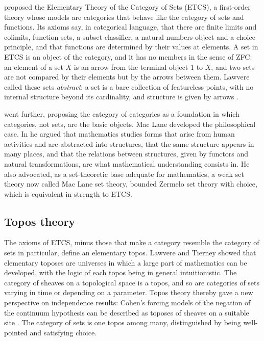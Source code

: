 \documentclass{situationist-preprint}
\begin{document}
\citet{Lawvere1964} proposed the Elementary Theory of the Category of Sets (ETCS), a first-order theory whose models are categories that behave like the category of sets and functions. Its axioms say, in categorical language, that there are finite limits and colimits, function sets, a subset classifier, a natural numbers object and a choice principle, and that functions are determined by their values at elements. A set in ETCS is an object of the category, and it has no members in the sense of ZFC: an element of a set $X$ is an arrow from the terminal object $1$ to $X$, and two sets are not compared by their elements but by the arrows between them. Lawvere called these sets \emph{abstract}: a set is a bare collection of featureless points, with no internal structure beyond its cardinality, and structure is given by arrows \citep{LawvereRosebrugh2003}.

\citet{Lawvere1966} went further, proposing the category of categories as a foundation in which categories, not sets, are the basic objects. Mac Lane developed the philosophical case. In \citet{MacLane1986} he argued that mathematics studies forms that arise from human activities and are abstracted into structures, that the same structure appears in many places, and that the relations between structures, given by functors and natural transformations, are what mathematical understanding consists in. He also advocated, as a set-theoretic base adequate for mathematics, a weak set theory now called Mac Lane set theory, bounded Zermelo set theory with choice, which is equivalent in strength to ETCS.

\subsection{Topos theory}

The axioms of ETCS, minus those that make a category resemble the category of sets in particular, define an elementary topos. Lawvere and Tierney showed that elementary toposes are universes in which a large part of mathematics can be developed, with the logic of each topos being in general intuitionistic. The category of sheaves on a topological space is a topos, and so are categories of sets varying in time or depending on a parameter. Topos theory thereby gave a new perspective on independence results: Cohen's forcing models of the negation of the continuum hypothesis can be described as toposes of sheaves on a suitable site \citep{MacLaneMoerdijk1992}. The category of sets is one topos among many, distinguished by being well-pointed and satisfying choice.
\end{document}
